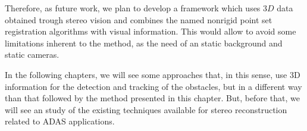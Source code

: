 Therefore, as future work, we plan to develop a framework which uses $3D$ data obtained trough stereo vision and 
combines the named nonrigid point set registration algorithms with visual information. This would allow to avoid some limitations inherent to the method, as the need of an static background and static cameras.

In the following chapters, we will see some approaches that, in this sense, use 3D information for the detection and tracking of the obstacles, but in a different way than that followed by the method presented in this chapter. But, before that, we will see an study of the existing techniques available for stereo reconstruction related to \ac{ADAS} applications.




